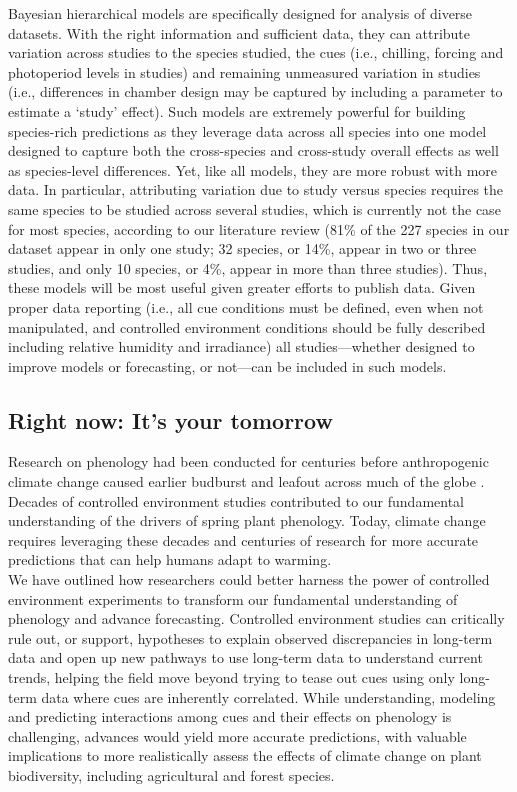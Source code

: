 \documentclass[11pt,letter]{article}
\begin{document}
Bayesian hierarchical models are specifically designed for analysis of diverse datasets. With the right information and sufficient data, they can attribute variation across studies to the species studied, the cues (i.e., chilling, forcing and photoperiod levels in studies) and remaining unmeasured variation in studies (i.e., differences in chamber design may be captured by including a parameter to estimate a `study' effect). Such models are extremely powerful for building species-rich predictions as they leverage data across all species into one model designed to capture both the cross-species and cross-study overall effects as well as species-level differences. Yet, like all models, they are more robust with more data. In particular, attributing variation due to study versus species requires the same species to be studied across several studies, which is currently not the case for most species, according to our literature review (81\% of the 227 species in our dataset appear in only one study; 32 species, or 14\%, appear in two or  three studies, and only 10 species, or 4\%, appear in more than three studies). Thus, these models will be most useful given greater efforts to publish data. Given proper data reporting (i.e., all cue conditions must be defined, even when not manipulated, and controlled environment conditions should be fully described including relative humidity and irradiance) all studies---whether designed to improve models or forecasting, or not---can be included in such models. 

\subsection{Right now: It's your tomorrow}
Research on phenology had been conducted for centuries before anthropogenic climate change caused earlier budburst and leafout across much of the globe \citep{Sparks:1995mv}. Decades of controlled environment studies contributed to our fundamental understanding of the drivers of spring plant phenology. Today, climate change requires leveraging these decades and centuries of research for more accurate predictions that can help humans adapt to warming. \\

We have outlined how researchers could better harness the power of controlled environment experiments to transform our fundamental understanding of phenology and advance forecasting. Controlled environment studies can critically rule out, or support, hypotheses to explain observed discrepancies in long-term data and open up new pathways to use long-term data to understand current trends, helping the field move beyond trying to tease out cues using only long-term data where cues are inherently correlated. While understanding, modeling and predicting interactions among cues and their effects on phenology is challenging, advances would yield more accurate predictions, with valuable implications to more realistically assess the effects of climate change on plant biodiversity, including agricultural and forest species. 
\end{document}

